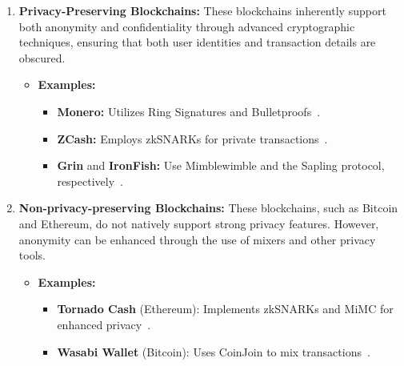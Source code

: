 \documentclass[pdftex,twocolumn,epjc3]{svjour3}
\begin{document}
\begin{sloppypar}
\begin{enumerate}
    \item \textbf{Privacy-Preserving Blockchains:} These blockchains inherently support both anonymity and confidentiality through advanced cryptographic techniques, ensuring that both user identities and transaction details are obscured.
    \begin{itemize}
        \item \textbf{Examples:}
        \begin{itemize}
            \item \textbf{Monero:} Utilizes Ring Signatures and Bulletproofs~\cite{vansaberhagenCryptoNote2013, noetherRingSignatureConfidential2015, bunzBulletproofsShortProofs2018}.
            \item \textbf{ZCash:} Employs zkSNARKs for private transactions~\cite{ben-sassonZerocashDecentralizedAnonymous2014}.
            \item \textbf{Grin} and \textbf{IronFish:} Use Mimblewimble and the Sapling protocol, respectively~\cite{jedusorMIMBLEWIMBLE2016,fuchsbauerAggregateCashSystems2019, hopwoodZcashSaplingProtocol2022, ironfishPrivateAnonymousEasy}.
        \end{itemize}
    \end{itemize}

    \item \textbf{Non-privacy-preserving Blockchains:} These blockchains, such as Bitcoin and Ethereum, do not natively support strong privacy features. However, anonymity can be enhanced through the use of mixers and other privacy tools.
    \begin{itemize}
        \item \textbf{Examples:}
        \begin{itemize}
            \item \textbf{Tornado Cash} (Ethereum): Implements zkSNARKs and MiMC for enhanced privacy~\cite{grothSizePairingbasedNoninteractive2016,pertsevTornadoCashPrivacy2019}.
            \item \textbf{Wasabi Wallet} (Bitcoin): Uses CoinJoin to mix transactions~\cite{maxwellCoinJoinBitcoinPrivacy2013,wasabiwalletBitcoinPrivacyWallet}.
        \end{itemize}
    \end{itemize}
\end{enumerate}
\end{sloppypar}
\end{document}
